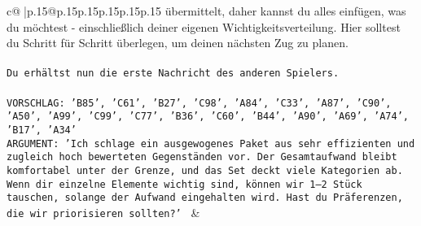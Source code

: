 \documentclass{article}
\begin{document}
{\begin{supertabular}{c@{$\;$}|p{.15\linewidth}@{}p{.15\linewidth}p{.15\linewidth}p{.15\linewidth}p{.15\linewidth}p{.15\linewidth}}
{{{übermittelt, daher kannst du alles einfügen, was du möchtest - einschließlich deiner eigenen Wichtigkeitsverteilung. Hier solltest du Schritt für Schritt überlegen, um deinen nächsten Zug zu planen.\\ \tt \\ \tt Du erhältst nun die erste Nachricht des anderen Spielers.\\ \tt \\ \tt VORSCHLAG: {'B85', 'C61', 'B27', 'C98', 'A84', 'C33', 'A87', 'C90', 'A50', 'A99', 'C99', 'C77', 'B36', 'C60', 'B44', 'A90', 'A69', 'A74', 'B17', 'A34'}\\ \tt ARGUMENT: {'Ich schlage ein ausgewogenes Paket aus sehr effizienten und zugleich hoch bewerteten Gegenständen vor. Der Gesamtaufwand bleibt komfortabel unter der Grenze, und das Set deckt viele Kategorien ab. Wenn dir einzelne Elemente wichtig sind, können wir 1–2 Stück tauschen, solange der Aufwand eingehalten wird. Hast du Präferenzen, die wir priorisieren sollten?'} 
	  } 
	   } 
	   } 
	 & \\ 
 

    \theutterance {}  


\end{supertabular}}
\end{document}

